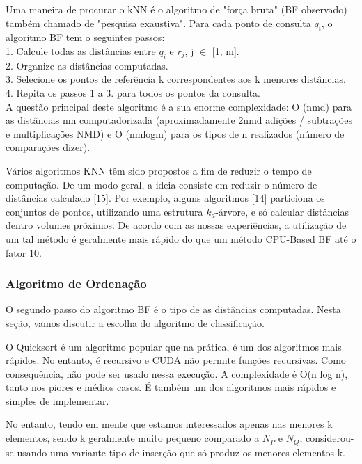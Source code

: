 \documentclass[letterpaper, 10 pt, conference]{ieeeconf}  %
\begin{document}
Uma maneira de procurar o kNN é o algoritmo de "força bruta" (BF observado) também chamado de "pesquisa exaustiva". Para cada ponto de consulta $q_i$, o algoritmo BF tem o seguintes passos:\\

1. Calcule todas as distâncias entre $q_i$ e $r_j$, j $\in$ [1, m].\\

2. Organize as distâncias computadas.\\

3. Selecione os pontos de referência k correspondentes aos k menores distâncias.\\

4. Repita os passos 1 a 3. para todos os pontos da consulta.\\

A questão principal deste algoritmo é a sua enorme complexidade: O (nmd) para as distâncias nm computadorizada (aproximadamente 2nmd adições / subtrações e multiplicações NMD) e
O (nmlogm) para os tipos de n realizados (número de comparações dizer).

Vários algoritmos KNN têm sido propostos a fim de reduzir o tempo de computação. De um modo geral, a ideia consiste em reduzir o número de distâncias calculado [15]. Por exemplo, alguns algoritmos [14] particiona os conjuntos de pontos, utilizando uma estrutura $k_d$-árvore, e só calcular distâncias dentro volumes próximos. De acordo com as nossas experiências, a utilização de um tal método é geralmente mais rápido do que um método CPU-Based BF até o fator 10.\\

\subsubsection{Algoritmo de Ordenação}

O segundo passo do algoritmo BF é o tipo de as distâncias computadas. Nesta seção, vamos discutir a escolha do algoritmo de classificação.

O Quicksort é um algoritmo popular que na prática, é um dos algoritmos mais rápidos. No entanto, é recursivo e CUDA não permite funções recursivas. Como consequência, não pode ser usado nessa execução. A complexidade é O(n log n), tanto nos piores e médios casos. É também um dos algoritmos mais rápidos e simples de implementar.

No entanto, tendo em mente que estamos interessados apenas nas menores k elementos, sendo k geralmente muito pequeno comparado a $N_P$ e $N_Q$, considerou-se usando uma variante tipo de inserção que só produz os menores elementos k.\\ 
\end{document}
